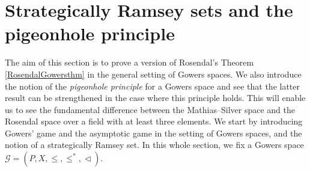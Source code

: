\documentclass[a4paper,11pt]{article}
\theoremstyle{definition}
\numberwithin{equation}{section}
\newcommand{\R}{\mathbb{R}}
\newcommand{\G}{\mathcal{G}}
\begin{document}















\bigskip

\section{Strategically Ramsey sets and the pigeonhole principle}\label{par3}

The aim of this section is to prove a version of Rosendal's Theorem \ref{RosendalGowersthm} in the general setting of Gowers spaces. We also introduce the notion of the \emph{pigeonhole principle} for a Gowers space and see that the latter result can be strengthened in the case where this principle holds. This will enable us to see the fundamental difference between the Mathias--Silver space and the Rosendal space over a field with at least three elements. We start by introducing Gowers' game and the asymptotic game in the setting of Gowers spaces, and the notion of a strategically Ramsey set. In this whole section, we fix a Gowers space $\G = (P, X, \leqslant, \leqslant^*, \vartriangleleft)$.
\end{document}
